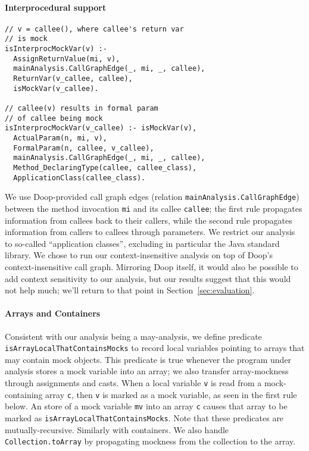 \paragraph{Interprocedural support} 
\begin{lstlisting}[basicstyle=\ttfamily\small,numbers=none]
// v = callee(), where callee's return var
// is mock
isInterprocMockVar(v) :-
  AssignReturnValue(mi, v),
  mainAnalysis.CallGraphEdge(_, mi, _, callee),
  ReturnVar(v_callee, callee),
  isMockVar(v_callee).

// callee(v) results in formal param 
// of callee being mock
isInterprocMockVar(v_callee) :- isMockVar(v),
  ActualParam(n, mi, v),
  FormalParam(n, callee, v_callee),
  mainAnalysis.CallGraphEdge(_, mi, _, callee),
  Method_DeclaringType(callee, callee_class),
  ApplicationClass(callee_class).
\end{lstlisting}
We use Doop-provided call graph edges (relation \texttt{mainAnalysis.CallGraphEdge}) between the method invocation {\tt mi} and its callee {\tt callee}; the first rule propagates information from callees back to their callers, while the second rule propagates information from callers to callees through parameters. We restrict our analysis to so-called ``application classes'', excluding in particular the Java standard library. We chose to run our context-insensitive analysis on top of Doop's context-insensitive call graph. Mirroring Doop itself, it would also be possible to add context sensitivity to our analysis, but our results suggest that this would not help much; we'll return to that point in Section~\ref{sec:evaluation}.

\paragraph{Arrays and Containers} Consistent with our analysis being a may-analysis, we define predicate {\tt isArrayLocalThatContainsMocks} to record local variables pointing to arrays that may contain mock objects. This predicate is true whenever the program under analysis stores a mock variable into an array; we also transfer array-mockness through assignments and casts. When a local variable \texttt{v} is read from a mock-containing array \texttt{c}, then \texttt{v} is marked as a mock variable, as seen in the first rule below. An store of a mock variable \texttt{mv} into an array \texttt{c} causes that array to be marked as \texttt{isArrayLocalThatContainsMocks}. Note that these predicates are mutually-recursive. Similarly with containers. We also handle {\tt Collection.toArray} by propagating mockness from the collection to the array.

